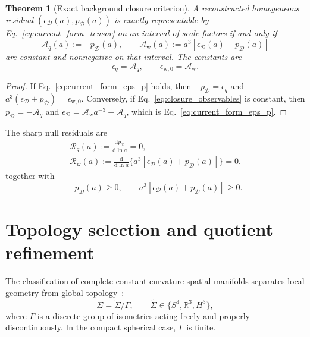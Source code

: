\documentclass[
  aps,
  prd,
  reprint,
  superscriptaddress,
  floatfix,
  nofootinbib,
  longbibliography
]{revtex4-2}
\theoremstyle{plain}
\newtheorem{theorem}{Theorem}
\theoremstyle{definition}
\theoremstyle{remark}
\newcommand{\dd}{\mathrm d}
\newcommand{\D}{\mathcal D}
\newcommand{\w}{\mathrm w}
\newcommand{\Aq}{\mathcal A_q}
\newcommand{\Aw}{\mathcal A_{\mathrm w}}
\newcommand{\Rcl}{\mathcal R}
\newcommand{\R}{\mathbb R}
\newcommand{\eps}{\epsilon}
\begin{document}
\begin{theorem}[Exact background closure criterion]
A reconstructed homogeneous residual \((\eps_\D(a),p_\D(a))\) is exactly representable by Eq.~\eqref{eq:current_form_tensor} on an interval of scale factors if and only if
\begin{equation}
\boxed{
\Aq(a):=-p_\D(a),\qquad
\Aw(a):=a^3[\eps_\D(a)+p_\D(a)]
}
\label{eq:closure_observables}
\end{equation}
are constant and nonnegative on that interval.  The constants are
\begin{equation}
\eps_q=\Aq,\qquad
\eps_{\w,0}=\Aw .
\label{eq:closure_constants}
\end{equation}
\end{theorem}

\begin{proof}
If Eq.~\eqref{eq:current_form_eps_p} holds, then \(-p_\D=\eps_q\) and \(a^3(\eps_\D+p_\D)=\eps_{\w,0}\).  Conversely, if Eq.~\eqref{eq:closure_observables} is constant, then \(p_\D=-\Aq\) and \(\eps_\D=\Aw a^{-3}+\Aq\), which is Eq.~\eqref{eq:current_form_eps_p}.
\end{proof}

The sharp null residuals are
\begin{align}
\boxed{\Rcl_q(a):=\frac{\dd p_\D}{\dd\ln a}=0,}
\label{eq:closure_derivative_tests}\\
\boxed{\Rcl_{\w}(a):=\frac{\dd}{\dd\ln a}
\{a^3[\eps_\D(a)+p_\D(a)]\}=0.}
\nonumber
\end{align}
together with
\begin{equation}
-p_\D(a)\ge0,\qquad
a^3[\eps_\D(a)+p_\D(a)]\ge0.
\label{eq:closure_positivity_tests}
\end{equation}

\section{Topology selection and quotient refinement}

The classification of complete constant-curvature spatial manifolds separates local geometry from global topology~\cite{Wolf,HawkingEllis}:
\begin{equation}
\Sigma=\widetilde\Sigma/\Gamma,
\qquad
\widetilde\Sigma\in\{S^3,\R^3,H^3\},
\label{eq:space_form_atlas}
\end{equation}
where \(\Gamma\) is a discrete group of isometries acting freely and properly discontinuously.  In the compact spherical case, \(\Gamma\) is finite.
\end{document}

